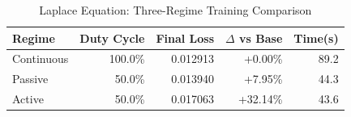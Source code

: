 \begin{table}[htbp]
\centering
\caption{Laplace Equation: Three-Regime Training Comparison}
\label{tab:laplace_regimes}
\begin{tabular}{lrrrr}
\hline
Regime & Duty Cycle & Final Loss & $\Delta$ vs Base & Time(s) \\
\hline
Continuous & 100.0\% & 0.012913 & +0.00\% & 89.2 \\
Passive & 50.0\% & 0.013940 & +7.95\% & 44.3 \\
Active & 50.0\% & 0.017063 & +32.14\% & 43.6 \\
\hline
\end{tabular}
\end{table}
